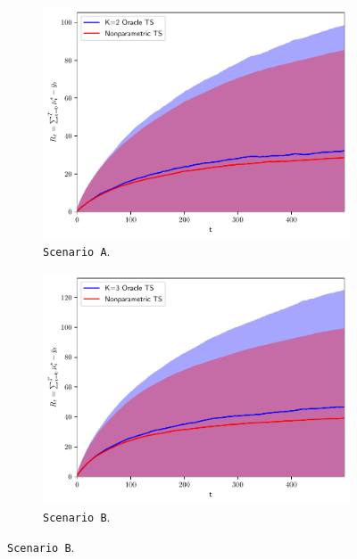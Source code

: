 \documentclass{article}
\begin{document}
\begin{figure}[!h]
	\centering
	\begin{subfigure}[c]{0.49\textwidth}
		\vspace*{-2ex}
		\includegraphics[width=\textwidth]{./figs/linearGaussianMixture/hard/cumregret_R3629}
		\vspace*{-4ex}
		\caption{\texttt{Scenario A}.}
		\label{fig:linear_gaussian_mixture_hard}
	\end{subfigure}
	\begin{subfigure}[c]{0.49\textwidth}
		\vspace*{-2ex}
		\includegraphics[width=\textwidth]{./figs/linearGaussianMixture/unbalanced/cumregret_R3641}
		\vspace*{-4ex}
		\caption{\texttt{Scenario B}.}
		\label{fig:linear_gaussian_mixture_unbalanced}
	\end{subfigure}


\end{figure}
\end{document}
